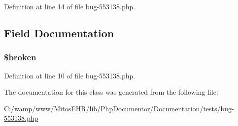 \-Definition at line 14 of file bug-\/553138.\-php.


\begin{DoxyCode}
        {
        }
\end{DoxyCode}


\subsection{\-Field \-Documentation}
\hypertarget{classbrokenlinkstovars_a23b526bfb9e5bc5bdb4bfdead61f256c}{
\subsubsection[{\$broken}]{\setlength{\rightskip}{0pt plus 5cm}\$broken}}\label{classbrokenlinkstovars_a23b526bfb9e5bc5bdb4bfdead61f256c}


\-Definition at line 10 of file bug-\/553138.\-php.



\-The documentation for this class was generated from the following file\-:\begin{DoxyCompactItemize}
\item 
\-C\-:/wamp/www/\-Mitos\-E\-H\-R/lib/\-Php\-Documentor/\-Documentation/tests/\hyperlink{bug-553138_8php}{bug-\/553138.\-php}\end{DoxyCompactItemize}
